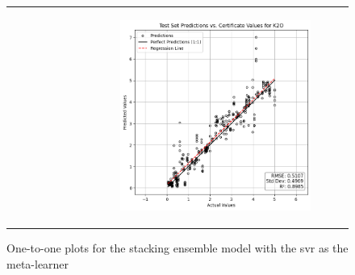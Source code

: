 \begin{figure}
{\begin{tabular}{cc}
\begin{subfigure}{0.5\textwidth}
            \end{subfigure} & \hspace{3cm}
            \begin{subfigure}{0.5\textwidth}
                \includegraphics[width=\textwidth]{images/one_to_one/svr/K2O.png}
            \end{subfigure}
        \end{tabular}
    }
    \caption{One-to-one plots for the stacking ensemble model with the \gls{svr} as the meta-learner}
    \label{fig:svr_one_to_one}
\end{figure}

